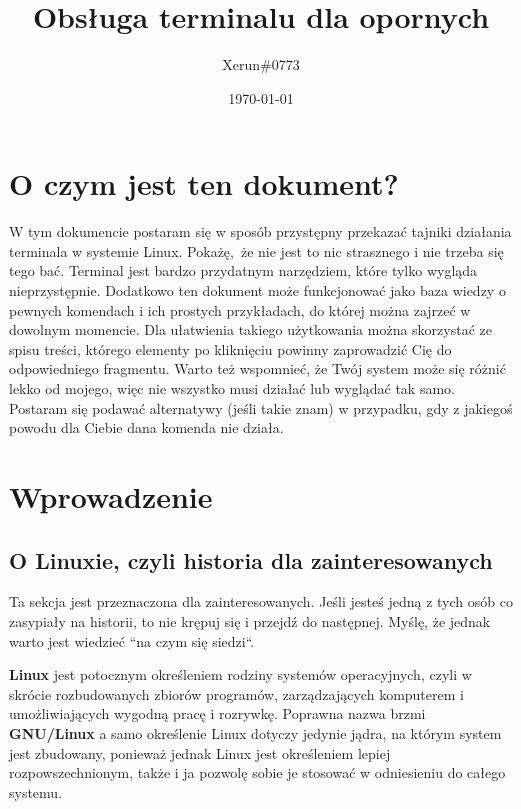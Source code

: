 \documentclass[12pt]{article}
\title{Obsługa terminalu dla opornych}
\author{Xerun\#0773}
\date{\today}
\begin{document}
\begin{titlepage}
    \null  %
    \nointerlineskip  %
    \vfill
    \let\snewpage \newpage
    \let\newpage \relax
    \maketitle
    \let \newpage \snewpage
    \vfill 
    \break %
\end{titlepage}

\section*{O czym jest ten dokument?}
    W tym dokumencie postaram się w sposób przystępny przekazać tajniki działania terminala w systemie Linux. Pokażę, że nie jest to nic strasznego i nie trzeba się tego bać. Terminal jest bardzo przydatnym narzędziem, które tylko wygląda nieprzystępnie. Dodatkowo ten dokument może funkcjonować jako baza wiedzy o pewnych komendach i ich prostych przykładach, do której można zajrzeć w dowolnym momencie. Dla ułatwienia takiego użytkowania można skorzystać ze spisu treści, którego elementy po kliknięciu powinny zaprowadzić Cię do odpowiedniego fragmentu. Warto też wspomnieć, że Twój system może się różnić lekko od mojego, więc nie wszystko musi działać lub wyglądać tak samo. Postaram się podawać alternatywy (jeśli takie znam) w przypadku, gdy z jakiegoś powodu dla Ciebie dana komenda nie działa.

\newpage
{\hypersetup{hidelinks}\tableofcontents}
\newpage
\section{Wprowadzenie}
\subsection{O Linuxie, czyli historia dla zainteresowanych}

Ta sekcja jest przeznaczona dla zainteresowanych. Jeśli jesteś jedną z tych osób co zasypiały na historii, to nie krępuj się i przejdź do następnej. Myślę, że jednak warto jest wiedzieć ``na czym się siedzi``.

\textbf{Linux} jest potocznym określeniem rodziny systemów operacyjnych, czyli w skrócie rozbudowanych zbiorów programów, zarządzających komputerem i umożliwiających wygodną pracę i rozrywkę. Poprawna nazwa brzmi \textbf{GNU/Linux} a samo określenie Linux dotyczy jedynie jądra, na którym system jest zbudowany, ponieważ jednak Linux jest określeniem lepiej rozpowszechnionym, także i ja pozwolę sobie je stosować w odniesieniu do całego systemu.
\end{document}
